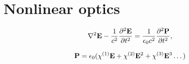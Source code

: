 \section{Nonlinear optics}





\begin{align*}
  \label{eq:wave-general}
  \nabla^2 \mathbf E - \frac{1}{c^2} \frac{\partial^2 \mathbf E}{\partial t^2}
  = \frac{1}{\epsilon_0c^2} \frac{\partial^2 \mathbf P}{\partial t^2},
\end{align*}

\[
\mathbf P = \epsilon_0 ( \chi^{\textup{(1)}} \mathbf E +
\chi^{\textup{(2)}} \mathbf E^2 + \chi^{\textup{(3)}} \mathbf E^3 \dots )
\]








